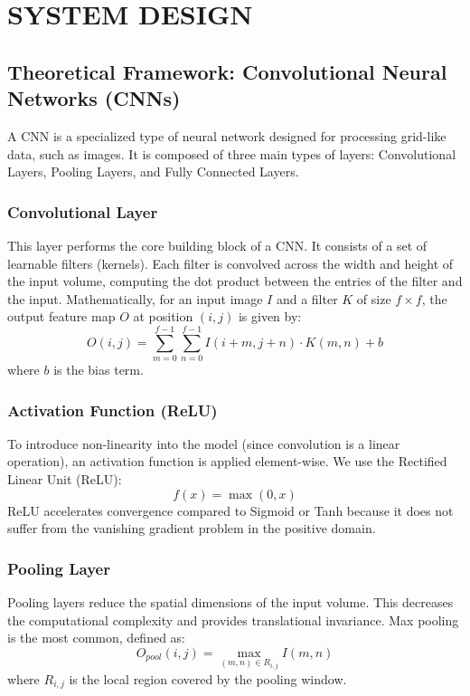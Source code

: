 \documentclass[twocolumn,10pt,a4paper]{article}
\begin{document}
\section{SYSTEM DESIGN}
\subsection{Theoretical Framework: Convolutional Neural Networks (CNNs)}
A CNN is a specialized type of neural network designed for processing grid-like data, such as images. It is composed of three main types of layers: Convolutional Layers, Pooling Layers, and Fully Connected Layers.

\subsubsection{Convolutional Layer}
This layer performs the core building block of a CNN. It consists of a set of learnable filters (kernels). Each filter is convolved across the width and height of the input volume, computing the dot product between the entries of the filter and the input.
Mathematically, for an input image $I$ and a filter $K$ of size $f \times f$, the output feature map $O$ at position $(i, j)$ is given by:
\begin{equation}
O(i, j) = \sum_{m=0}^{f-1} \sum_{n=0}^{f-1} I(i+m, j+n) \cdot K(m, n) + b
\end{equation}
where $b$ is the bias term.

\subsubsection{Activation Function (ReLU)}
To introduce non-linearity into the model (since convolution is a linear operation), an activation function is applied element-wise. We use the Rectified Linear Unit (ReLU):
\begin{equation}
f(x) = \max(0, x)
\end{equation}
ReLU accelerates convergence compared to Sigmoid or Tanh because it does not suffer from the vanishing gradient problem in the positive domain.

\subsubsection{Pooling Layer}
Pooling layers reduce the spatial dimensions of the input volume. This decreases the computational complexity and provides translational invariance. Max pooling is the most common, defined as:
\begin{equation}
O_{pool}(i, j) = \max_{(m, n) \in R_{i,j}} I(m, n)
\end{equation}
where $R_{i,j}$ is the local region covered by the pooling window.
\end{document}
